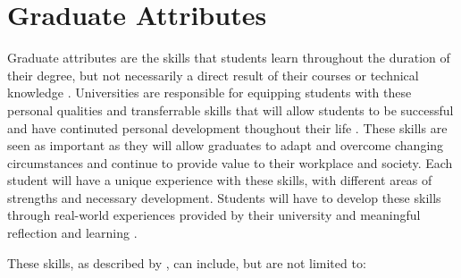 \documentclass{l4proj}
\begin{document}
\section{Graduate Attributes}

Graduate attributes are the skills that students learn throughout the duration of their degree, but not necessarily a direct result of their courses or technical knowledge \citep{glasgow_university_attributes}. Universities are responsible for equipping students with these personal qualities and transferrable skills that will allow students to be successful and have continuted personal development thoughout their life \citep{stirling_graduate_nodate}. These skills are seen as important as they will allow graduates to adapt and overcome changing circumstances and continue to provide value to their workplace and society. Each student will have a unique experience with these skills, with different areas of strengths and necessary development. Students will have to develop these skills through real-world experiences provided by their university and meaningful reflection and learning \citep{edinburgh_definition_skills}.

These skills, as described by \citet{litchfield_contextualising_2010, stevens_industry_2016, bruno_reflective_2018}, can include, but are not limited to:
\end{document}
